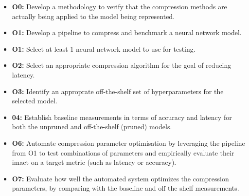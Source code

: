 \documentclass[../Dissertation.tex]{subfiles}
\begin{document}
\begin{itemize}
    \item \textbf{O0:}\label{obj:VerifyComp} Develop a methodology to verify that the compression methods are actually being applied to the model being represented.
    \item \textbf{O1:}\label{obj:BuildPipeline} Develop a pipeline to compress and benchmark a neural network model.
    \item \textbf{O1:}\label{obj:ModelSel} Select at least 1 neural network model to use for testing.
    \item \textbf{O2:}\label{obj:SelCompress} Select an appropriate compression algorithm for the goal of reducing latency.
    \item \textbf{O3:}\label{obj:OTSparams} Identify an approprate off-the-shelf set of hyperparameters for the selected model.
    \item \textbf{04:}\label{obj:baselines} Establish baseline measurements in terms of accuracy and latency for both the unpruned and off-the-shelf (pruned) models. 
    \item \textbf{O6:}\label{obj:AutoParams} Automate compression parameter optimisation by leveraging the pipeline from O1 to test combinations of parameters and empirically evaluate their imact on a target metric (such as latency or accuracy). 
    \item \textbf{O7:}\label{obj:EvaluateResutls} Evaluate how well the automated system optimizes the compression parameters, by comparing with the baseline and off the shelf measurements.

\end{itemize}
\end{document}
